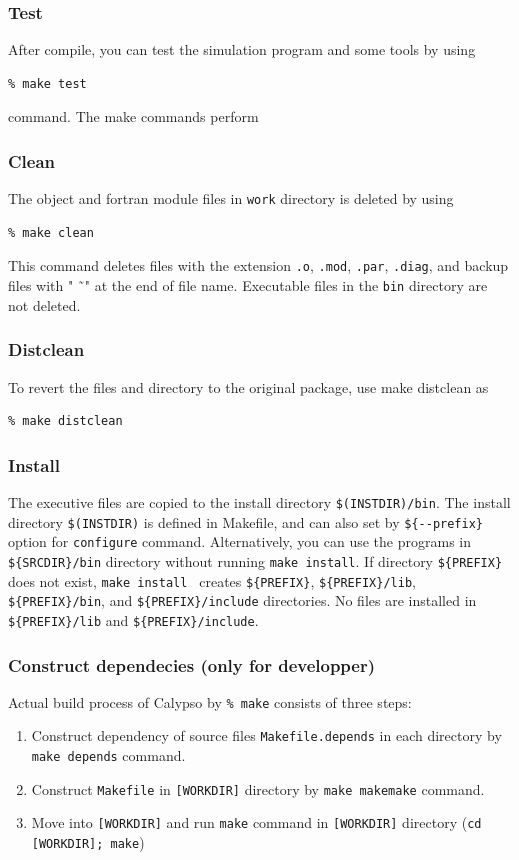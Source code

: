 \subsubsection{Test}
After compile, you can test the simulation program and some tools by using
\begin{verbatim}
% make test
\end{verbatim}
command. The make commands perform 

\subsubsection{Clean}
The object and fortran module files in {\tt work} directory is deleted by using
\begin{verbatim}
% make clean
\end{verbatim}
This command deletes files with the extension {\tt .o}, {\tt .mod}, {\tt .par}, {\tt .diag}, and backup files with " \~\ " at the end of file name. Executable files in the {\tt bin} directory are not deleted.

\subsubsection{Distclean}
To revert the files and directory to the original package, use make distclean as
\begin{verbatim}
% make distclean
\end{verbatim}


\subsubsection{Install}
 The executive files are copied to the install directory \verb|$(INSTDIR)/bin|. The install directory \verb|$(INSTDIR)| is defined in Makefile, and can also set by  \verb|${--prefix}| option for \verb|configure| command. Alternatively, you can use the programs in \verb|${SRCDIR}/bin| directory without running \verb|make install|. If directory \verb|${PREFIX}| does not exist, \verb|make install | creates  \verb|${PREFIX}|,  \verb|${PREFIX}/lib|,  \verb|${PREFIX}/bin|, and  \verb|${PREFIX}/include| directories. No files are installed in \verb|${PREFIX}/lib| and \verb|${PREFIX}/include|.


\subsubsection{Construct dependecies (only for developper)}
Actual build process of Calypso by \verb|% make| consists of three steps:
%
\begin{enumerate}
\item Construct dependency of source files {\tt Makefile.depends} in each directory by  {\tt make depends} command.
\item Construct {\tt Makefile} in {\tt [WORKDIR]} directory by {\tt make makemake} command.
\item Move into  {\tt [WORKDIR]}  and run {\tt make} command in {\tt [WORKDIR]} directory ({\tt cd [WORKDIR]; make})
\end{enumerate}
%

